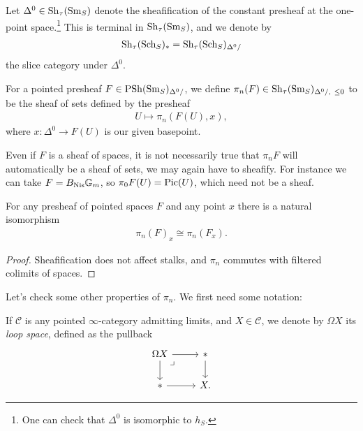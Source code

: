 \documentclass[11pt,openany]{book}
\begin{document}
\begin{definition}\label{def:terminal-sheaf}
Let $\Delta^0\in \mathrm{Sh}_\tau(\mathrm{Sm}_S)$ denote the sheafification of the constant presheaf at the one-point space.\footnote{One can check that $\Delta^0$ is isomorphic to $h_S$.} This is terminal in $\mathrm{Sh}_\tau(\mathrm{Sm}_S)$, and we denote by
\begin{align*}
    \mathrm{Sh}_\tau(\mathrm{Sch}_S)_\ast = \mathrm{Sh}_\tau(\mathrm{Sch}_S)_{\Delta^0 /}
\end{align*}
the slice category under $\Delta^0$.
\end{definition}



\begin{definition}\label{def:homotopy-sheaf}
For a pointed presheaf $F\in \mathrm{PSh}(\mathrm{Sm}_S)_{\Delta^0 /}$, we define $\pi_n(F)\in \mathrm{Sh}_\tau(\mathrm{Sm}_S)_{\Delta^0 /,\ \le 0}$ to be the sheaf of sets defined by the presheaf
\begin{equation}\label{eqn:homotopy-group-presheaf}
\begin{aligned}
    U \mapsto \pi_n(F(U),x),
\end{aligned}
\end{equation}
where $x \colon \Delta^0 \to F(U)$ is our given basepoint.
\end{definition}

\begin{remark} Even if $F$ is a sheaf of spaces, it is not necessarily true that $\pi_n F$ will automatically be a sheaf of sets, we may again have to sheafify. For instance we can take $F = B_{\mathrm{Nis}} \mathbb{G}_m$, so $\pi_0 F(U) = \mathrm{Pic}(U)$, which need not be a sheaf.
\end{remark}

\begin{proposition} For any presheaf of pointed spaces $F$ and any point $x$ there is a natural isomorphism
\begin{align*}
    \pi_n(F)_x \cong \pi_n(F_x).
\end{align*}
\end{proposition}
\begin{proof} 
Sheafification does not affect stalks, and $\pi_n$ commutes with filtered colimits of spaces.
\end{proof}

Let's check some other properties of $\pi_n$. We first need some notation:
\begin{notation} If $\mathscr{C}$ is any pointed $\infty$-category admitting limits, and $X\in \mathscr{C}$, we denote by $\Omega X$ its \textit{loop space}, defined as the pullback
\[ \begin{tikzcd}
    \Omega X\rar\dar\pb & \ast\dar\\
    \ast\rar & X.
\end{tikzcd} \]
\end{notation}
\end{document}
